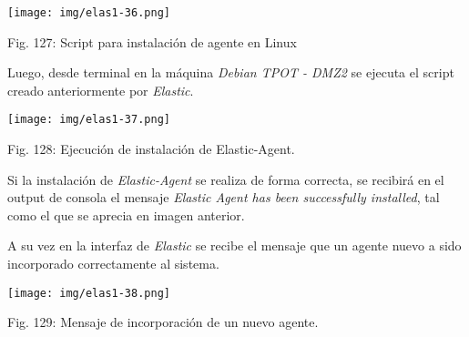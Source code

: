 \documentclass[12pt,oneside,a4paper]{book}
\begin{document}
\vspace{2em}

\begin{center}
    \texttt{[image: img/elas1-36.png]}
    
\vspace{0.1em}
    
    Fig. 127: Script para instalación de agente en Linux
\end{center}

\vspace{2em}


\hspace{20pt}
Luego, desde terminal en la máquina \textit{Debian TPOT - DMZ2} se ejecuta el script creado anteriormente por \textit{Elastic}.

\vspace{2em}

\begin{center}
    \texttt{[image: img/elas1-37.png]}
    
\vspace{0.1em}
    
    Fig. 128: Ejecución de instalación de Elastic-Agent.
\end{center}

\vspace{2em}

\hspace{20pt}
 Si la instalación de \textit{Elastic-Agent} se realiza de forma correcta, se recibirá en el output de consola el mensaje \textit{Elastic Agent has been successfully installed}, tal como el que se aprecia en imagen anterior.

\vspace{1em}

\hspace{20pt}
A su vez en la interfaz de \textit{Elastic} se recibe el mensaje que un agente nuevo a sido incorporado correctamente al sistema.

\vspace{2em}

\begin{center}
    \texttt{[image: img/elas1-38.png]}
    
\vspace{0.1em}
    
    Fig. 129: Mensaje de incorporación de un nuevo agente.
\end{center}

\vspace{2em}
\end{document}
